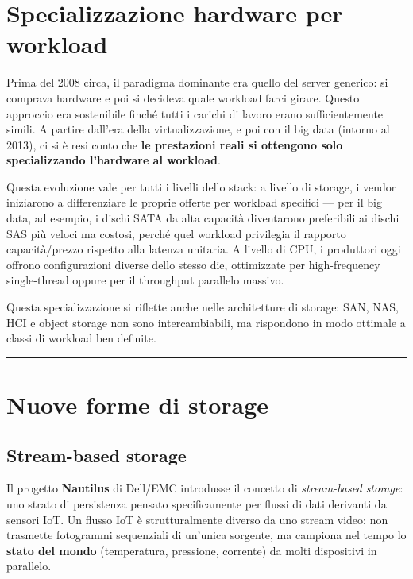 \documentclass[
  italian,
  openany]{book}
\begin{document}
\section{Specializzazione hardware per
workload}\label{specializzazione-hardware-per-workload}

Prima del 2008 circa, il paradigma dominante era quello del server
generico: si comprava hardware e poi si decideva quale workload farci
girare. Questo approccio era sostenibile finché tutti i carichi di
lavoro erano sufficientemente simili. A partire dall'era della
virtualizzazione, e poi con il big data (intorno al 2013), ci si è resi
conto che \textbf{le prestazioni reali si ottengono solo specializzando
l'hardware al workload}.

Questa evoluzione vale per tutti i livelli dello stack: a livello di
storage, i vendor iniziarono a differenziare le proprie offerte per
workload specifici --- per il big data, ad esempio, i dischi SATA da
alta capacità diventarono preferibili ai dischi SAS più veloci ma
costosi, perché quel workload privilegia il rapporto capacità/prezzo
rispetto alla latenza unitaria. A livello di CPU, i produttori oggi
offrono configurazioni diverse dello stesso die, ottimizzate per
high-frequency single-thread oppure per il throughput parallelo massivo.

Questa specializzazione si riflette anche nelle architetture di storage:
SAN, NAS, HCI e object storage non sono intercambiabili, ma rispondono
in modo ottimale a classi di workload ben definite.

\begin{center}\rule{0.5\linewidth}{0.5pt}\end{center}

\section{Nuove forme di storage}\label{nuove-forme-di-storage}

\subsection{Stream-based storage}\label{stream-based-storage}

Il progetto \textbf{Nautilus} di Dell/EMC introdusse il concetto di
\emph{stream-based storage}: uno strato di persistenza pensato
specificamente per flussi di dati derivanti da sensori IoT. Un flusso
IoT è strutturalmente diverso da uno stream video: non trasmette
fotogrammi sequenziali di un'unica sorgente, ma campiona nel tempo lo
\textbf{stato del mondo} (temperatura, pressione, corrente) da molti
dispositivi in parallelo.
\end{document}
